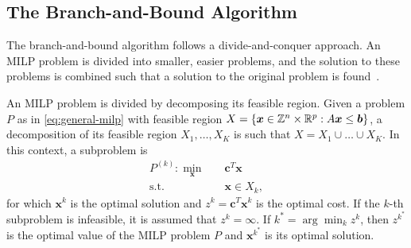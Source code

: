\subsection{The Branch-and-Bound Algorithm}

The branch-and-bound algorithm follows a divide-and-conquer approach.
An MILP problem is divided into smaller, easier problems, and the solution to these problems is combined such that a solution to the original problem is found~\cite{wolseyIntegerProgramming1998}.

An MILP problem is divided by decomposing its feasible region.
Given a problem $P$ as in \eqref{eq:general-milp} with feasible region $X=\{\bm{x}\in \mathbb{Z}^{n}\times \mathbb{R}^{p}: A\bm{x}\le \bm{b}\}$, a decomposition of its feasible region $X_1,\ldots,X_K$ is such that $X=X_1\cup \ldots\cup X_K$.
In this context, a subproblem is
\begin{equation}\label{eq:milp-subproblem}
\begin{split}
    P^{(k)} : \min_{\bm{x}} \quad & \bm{c}^{T}\bm{x} \\
    \textrm{s.t.} \quad & \bm{x}\in X_k
,\end{split}
\end{equation}
for which $\bm{x}^{k}$ is the optimal solution and $z^{k}=\bm{c}^{T}\bm{x}^{k}$ is the optimal cost.
If the $k$-th subproblem is infeasible, it is assumed that $z^{k}=\infty$.
If $k^{*}= \arg\min_k z^{k}$, then $z^{k^*}$ is the optimal value of the MILP problem $P$ and $\bm{x}^{k^*}$ is its optimal solution.


